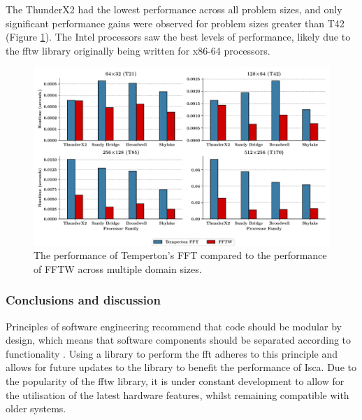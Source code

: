\documentclass[a4paper,11pt]{report}
\begin{document}
\par
The ThunderX2 had the lowest performance across all problem sizes, and only significant performance gains were observed for problem sizes greater than T42 (Figure \ref{fig:fft-times}). The Intel processors saw the best levels of performance, likely due to the \gls{fftw} library originally being written for x86-64 processors. 

\begin{figure}[H]
    \centering
    \includegraphics[width=1\textwidth]{img/compare_fft.pdf}
    \caption[Performance comparison of FFTW and Temperton's FFT]{The performance of Temperton's FFT compared to the performance of FFTW across multiple domain sizes.  }
    \label{fig:fft-times}
\end{figure}

\subsubsection{Conclusions and discussion}
Principles of software engineering recommend that code should be modular by design, which means that software components should be separated according to functionality \cite{parnas1972criteria}. Using a library to perform the \gls{fft} adheres to this principle and allows for future updates to the library to benefit the performance of Isca. Due to the popularity of the \gls{fftw} library, it is under constant development to allow for the utilisation of the latest hardware features, whilst remaining compatible with older systems. 
\par
\end{document}
